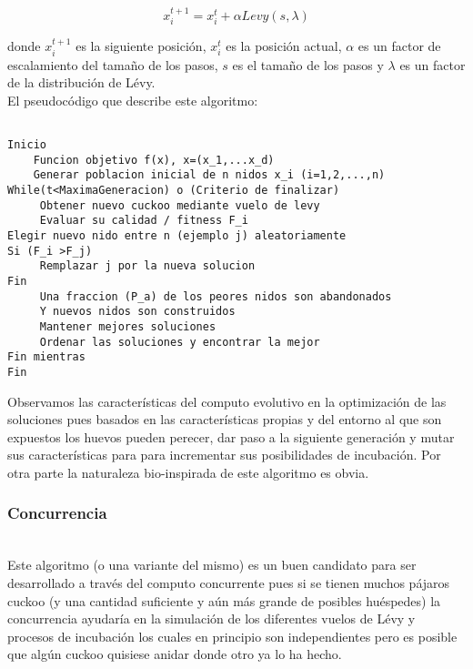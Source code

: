 \documentclass{article}
\begin{document}
\begin{equation}
x ^{t+1}_i = x_i ^t + \alpha Levy (s, \lambda)
\end{equation}

donde $x ^{t+1}_i$ es la siguiente posición, $x ^{t}_i$ es la posición actual, $\alpha$ es un factor de escalamiento del tamaño de los pasos, $s$ es el tamaño de los pasos y $\lambda$ es un factor de la distribución de Lévy.\\

El pseudocódigo que describe este algoritmo:

\begin{lstlisting}

Inicio
    Funcion objetivo f(x), x=(x_1,...x_d)
    Generar poblacion inicial de n nidos x_i (i=1,2,...,n)
While(t<MaximaGeneracion) o (Criterio de finalizar)
     Obtener nuevo cuckoo mediante vuelo de levy
     Evaluar su calidad / fitness F_i
Elegir nuevo nido entre n (ejemplo j) aleatoriamente
Si (F_i >F_j) 
     Remplazar j por la nueva solucion
Fin
     Una fraccion (P_a) de los peores nidos son abandonados
     Y nuevos nidos son construidos
     Mantener mejores soluciones
     Ordenar las soluciones y encontrar la mejor
Fin mientras
Fin 
\end{lstlisting}


Observamos las características del computo evolutivo en la optimización de las soluciones pues basados en las características propias y del entorno al que son expuestos los huevos pueden perecer, dar paso a la siguiente generación y mutar sus características para para incrementar sus posibilidades de incubación. Por otra parte la naturaleza bio-inspirada de este algoritmo es obvia.\\

\subsubsection{Concurrencia}\\
Este algoritmo (o una variante del mismo) es un buen candidato para ser desarrollado a través del computo concurrente pues si se tienen muchos pájaros cuckoo (y una cantidad suficiente y aún más grande de posibles huéspedes) la concurrencia ayudaría en la simulación de los diferentes vuelos de Lévy y procesos de incubación los cuales en principio son independientes pero es posible que algún cuckoo quisiese anidar donde otro ya lo ha hecho. 
\end{document}
